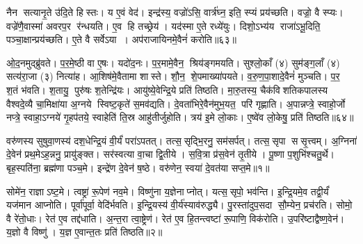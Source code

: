 नैन सत्यानृ॒ते उ॑दि॒ते हिस्तः।
य ए॒वं वेद॑।
इन्द्र॑स्य॒ वज्रो॑ऽसि॒ वार्त्र॑घ्न॒ इति॒ स्प्यं प्रय॑च्छति।
वज्रो॒ वै स्प्यः।
वज्रे॑णै॒वास्मा॑ अवरप॒र र॑न्धयति।
ए॒व हि तच्छ्रेय॑।
यद॑स्मा ए॒ते रध्ये॑युः।
दिशो॒ऽभ्य॑य राजा॑ऽभू॒दिति॒ पञ्चा॒क्षान्प्रय॑च्छति।
ए॒ते वै सर्वेऽया।
अप॑राजायिनमे॒वैनं॑ करोति॥६३॥

ओ॒द॒नमुद्ब्रु॑वते।
प॒र॒मे॒ष्ठी वा ए॒षः।
यदो॑द॒नः।
प॒र॒मामे॒वैन॒ श्रिय॑ङ्गमयति।
सुश्लो॒काँ (४) सुम॑ङ्ग॒लाँ (४) सत्य॑रा॒जा (३) नित्या॑ह।
आ॒शिष॑मे॒वैतामा शास्ते।
शौ॒न॒ शे॒पमाख्या॑पयते।
व॒रु॒ण॒पा॒शादे॒वैनं॑ मुञ्चति।
प॒र॒ श॒तं भ॑वति।
श॒तायु॒ पुरु॑षः श॒तेन्द्रि॑यः।
आयु॑ष्ये॒वेन्द्रि॒ये प्रति॑ तिष्ठति।
मा॒रु॒तस्य॒ चैक॑विशतिकपालस्य वैश्वदे॒व्यै चा॒मिक्षा॑या अ॒ग्नये स्विष्ट॒कृते॑ स॒मव॑द्यति।
दे॒वता॑भिरे॒वैन॑मुभ॒यत॒ परि॑ गृह्णाति।
अ॒पान्नप्त्रे॒ स्वाहो॒र्जो नप्त्रे॒ स्वाहा॒ऽग्नये॑ गृ॒हप॑तये॒ स्वाहेति॑ ति॒स्र आहु॑तीर्जुहोति।
त्रय॑ इ॒मे लो॒काः।
ए॒ष्वे॑व लो॒केषु॒ प्रति॑ तिष्ठति॥६४॥\anuvakamend[दे॒वैरित्या॑ह स॒त्यस॑वं करोति त्रि॒ष्टुभ॑मे॒वैतेना॑भि॒ व्याह॑रति सत्यानृ॒ते ए॒वाव॑रुन्धे करोति श॒तेन्द्रि॑य॒ष्षट् च॑]




\clearpage
{}
\setcounter{anuvakam}{0}

वरु॑णस्य सुषुवा॒णस्य॑ दश॒धेन्द्रि॒यं वी॒र्यं॑ परा॑ऽपतत्।
तत्स॒सृद्भि॒रनु॒ सम॑सर्पत्।
तत्स॒सृपा ससृ॒त्त्वम्।
अ॒ग्निना॑ दे॒वेन॑ प्रथ॒मेऽह॒न्ननु॒ प्रायु॑ङ्क्त।
सर॑स्वत्या वा॒चा द्वि॒तीये।
स॒वि॒त्रा प्र॑स॒वेन॑ तृ॒तीये।
पू॒ष्णा प॒शुभि॑श्चतु॒र्थे।
बृह॒स्पति॑ना॒ ब्रह्म॑णा पञ्च॒मे।
इन्द्रे॑ण दे॒वेन॑ ष॒ष्ठे।
वरु॑णेन॒ स्वया॑ दे॒वत॑या सप्त॒मे॥१॥

सोमे॑न॒ राज्ञाऽष्ट॒मे।
त्वष्ट्रा॑ रू॒पेण॑ नव॒मे।
विष्णु॑ना य॒ज्ञेनाप्नोत्।
यत्स॒सृपो॒ भव॑न्ति।
इ॒न्द्रि॒यमे॒व तद्वी॒र्यं॑ यज॑मान आप्नोति।
पूर्वा॑पूर्वा॒ वेदि॑र्भवति।
इ॒न्द्रि॒यस्य॑ वी॒र्य॑स्याव॑रुद्ध्यै।
पु॒रस्ता॑दुप॒सदा सौ॒म्येन॒ प्रच॑रति।
सोमो॒ वै रे॑तो॒धाः।
रेत॑ ए॒व तद्द॑धाति।
अ॒न्त॒रा त्वा॒ष्ट्रेण॑।
रेत॑ ए॒व हि॒तन्त्वष्टा॑ रू॒पाणि॒ विक॑रोति।
उ॒परि॑ष्टाद्वैष्ण॒वेन॑।
य॒ज्ञो वै विष्णु॑।
य॒ज्ञ ए॒वान्त॒तः प्रति॑ तिष्ठति॥२॥\anuvakamend[स॒प्त॒मे द॑धाति॒ पञ्च॑ च]

